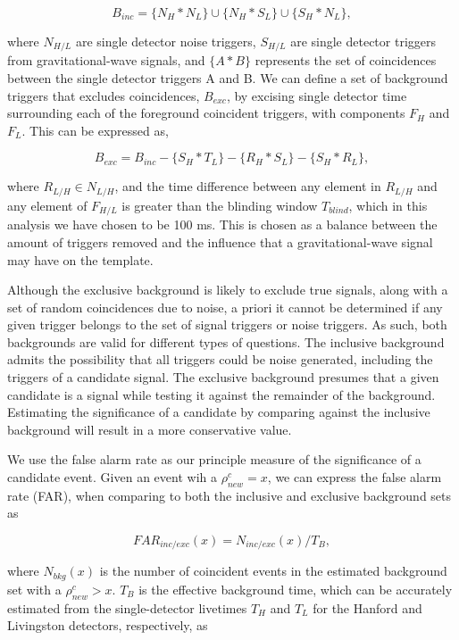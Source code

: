 \begin{equation}
B_{inc} = \{N_H * N_L\} \cup \{ N_H * S_L \} \cup \{S_H * N_L\},
\end{equation}

where $N_{H/L}$ are single detector noise triggers, $S_{H/L}$ are single detector triggers from gravitational-wave signals, and $\{A * B\}$ represents the set of coincidences between the single detector triggers A and B. We can define a set of background triggers that excludes coincidences, $B_{exc}$, by excising single detector time surrounding each of the foreground coincident triggers, with components $F_H$ and $F_L$. This can be expressed as,

\begin{equation}
B_{exc} = B_{inc} - \{S_H * T_L\} - \{R_H * S_L\} - \{S_H * R_L\},
\end{equation}

where $R_{L/H} \in N_{L/H}$, and the time difference between any element in $R_{L/H}$ and any element of $F_{H/L}$ is greater than the blinding window $T_{blind}$, which in this analysis we have chosen to be 100 ms. This is chosen as a balance between the amount of triggers removed and the influence that a gravitational-wave signal may have on the template. 

Although the exclusive background is likely to exclude true signals, along with a set of random coincidences due to noise, a priori it cannot be determined if any given trigger belongs to the set of signal triggers or noise triggers. As such, both backgrounds are valid for different types of questions. The inclusive background admits the possibility that all triggers could be noise generated, including the triggers of a candidate signal. The exclusive background presumes that a given candidate is a signal while testing it against the remainder of the background. Estimating the significance of a candidate by comparing against the inclusive background will result in a more conservative value.

We use the false alarm rate as our principle measure of the significance of a candidate event. Given an event wih a $\rho^c_{new}=x$, we can express the false alarm rate (FAR), when comparing to both the inclusive and exclusive background sets as

\begin{equation}
FAR_{inc/exc} (x) = N_{inc/exc} (x) / {T_B},
\end{equation}

where $N_{bkg}(x)$ is the number of coincident events in the estimated background set with a $\rho^c_{new} > x$. $T_B$ is the effective background time, which can be accurately estimated from the single-detector livetimes $T_H$ and $T_L$ for the Hanford and Livingston detectors, respectively, as

